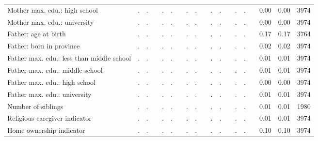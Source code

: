 \begin{tabular}{l c c c c c c c c c c c c c c c c c c}
Mother max. edu.: high school &         . &         . & &         . &         . & &         . &         . & &         . &         . & &         . &         . & &      0.00 &      0.00 &      3974 \\
Mother max. edu.: university &         . &         . & &         . &         . & &         . &         . & &         . &         . & & \textbf{        .} &         . & &      0.00 &      0.00 &      3974 \\
Father: age at birth &         . &         . & &         . &         . & &         . &         . & &         . &         . & &         . &         . & &      0.17 &      0.17 &      3764 \\
Father: born in province &         . &         . & &         . &         . & &         . &         . & &         . &         . & &         . &         . & &      0.02 &      0.02 &      3974 \\
Father max. edu.: less than middle school &         . &         . & &         . &         . & &         . &         . & & \textbf{        .} &         . & &         . &         . & &      0.01 &      0.01 &      3974 \\
Father max. edu.: middle school &         . &         . & &         . &         . & &         . &         . & &         . &         . & & \textbf{        .} &         . & &      0.01 &      0.01 &      3974 \\
Father max. edu.: high school &         . &         . & &         . &         . & &         . &         . & &         . &         . & &         . &         . & &      0.00 &      0.00 &      3974 \\
Father max. edu.: university &         . &         . & &         . &         . & &         . &         . & & \textbf{        .} &         . & &         . &         . & &      0.01 &      0.01 &      3974 \\
Number of siblings &         . &         . & &         . &         . & &         . &         . & &         . &         . & &         . &         . & &      0.01 &      0.01 &      1980 \\
Religious caregiver indicator &         . &         . & &         . &         . & & \textbf{        .} &         . & & \textbf{        .} &         . & &         . &         . & &      0.01 &      0.01 &      3974 \\
Home ownership indicator &         . &         . & &         . &         . & &         . &         . & &         . &         . & & \textbf{        .} &         . & &      0.10 &      0.10 &      3974 \\

\end{tabular}
